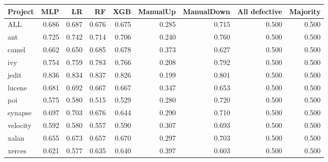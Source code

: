 \small
\begin{tabular}{lrrrrrrrr}
\toprule
Project & MLP & LR & RF & XGB & ManualUp & ManualDown & All defective & Majority \\
\midrule
ALL & 0.686 & 0.687 & 0.676 & 0.675 & 0.285 & 0.715 & 0.500 & 0.500 \\
ant & 0.725 & 0.742 & 0.714 & 0.706 & 0.240 & 0.760 & 0.500 & 0.500 \\
camel & 0.662 & 0.650 & 0.685 & 0.678 & 0.373 & 0.627 & 0.500 & 0.500 \\
ivy & 0.754 & 0.759 & 0.783 & 0.766 & 0.208 & 0.792 & 0.500 & 0.500 \\
jedit & 0.836 & 0.834 & 0.837 & 0.826 & 0.199 & 0.801 & 0.500 & 0.500 \\
lucene & 0.681 & 0.692 & 0.667 & 0.667 & 0.347 & 0.653 & 0.500 & 0.500 \\
poi & 0.575 & 0.580 & 0.515 & 0.529 & 0.280 & 0.720 & 0.500 & 0.500 \\
synapse & 0.697 & 0.703 & 0.676 & 0.644 & 0.290 & 0.710 & 0.500 & 0.500 \\
velocity & 0.592 & 0.580 & 0.557 & 0.590 & 0.307 & 0.693 & 0.500 & 0.500 \\
xalan & 0.655 & 0.673 & 0.657 & 0.670 & 0.297 & 0.703 & 0.500 & 0.500 \\
xerces & 0.621 & 0.577 & 0.635 & 0.640 & 0.397 & 0.603 & 0.500 & 0.500 \\
\bottomrule
\end{tabular}
